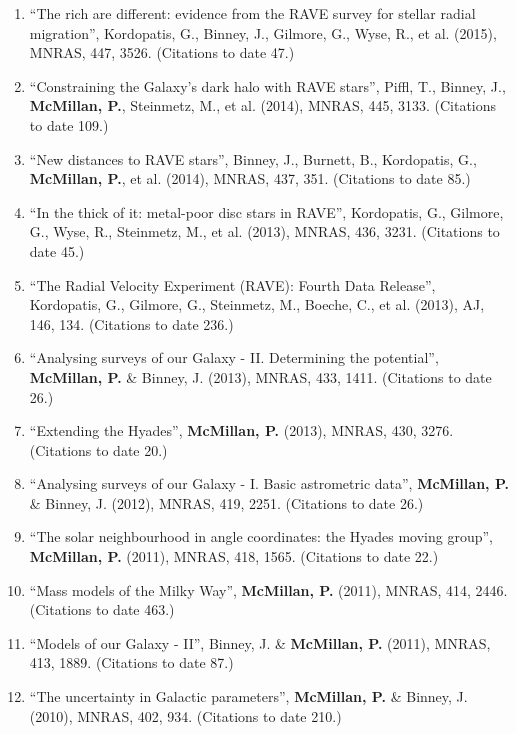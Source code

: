\documentclass{resume}
\begin{document}
\begin{enumerate}
\item ``The rich are different: evidence from the RAVE survey for stellar radial migration'', Kordopatis, G., Binney, J., Gilmore, G., Wyse, R., et al. (2015), MNRAS, 447, 3526. (Citations to date 47.)

\item ``Constraining the Galaxy's dark halo with RAVE stars'', Piffl, T., Binney, J., \textbf{McMillan, P.}, Steinmetz, M., et al. (2014), MNRAS, 445, 3133. (Citations to date 109.)

\item ``New distances to RAVE stars'', Binney, J., Burnett, B., Kordopatis, G., \textbf{McMillan, P.}, et al. (2014), MNRAS, 437, 351. (Citations to date 85.)

\item ``In the thick of it: metal-poor disc stars in RAVE'', Kordopatis, G., Gilmore, G., Wyse, R., Steinmetz, M., et al. (2013), MNRAS, 436, 3231. (Citations to date 45.)

\item ``The Radial Velocity Experiment (RAVE): Fourth Data Release'', Kordopatis, G., Gilmore, G., Steinmetz, M., Boeche, C., et al. (2013), AJ, 146, 134. (Citations to date 236.)

\item ``Analysing surveys of our Galaxy - II. Determining the potential'', \textbf{McMillan, P.} \& Binney, J. (2013), MNRAS, 433, 1411. (Citations to date 26.)

\item ``Extending the Hyades'', \textbf{McMillan, P.} (2013), MNRAS, 430, 3276. (Citations to date 20.)

\item ``Analysing surveys of our Galaxy - I. Basic astrometric data'', \textbf{McMillan, P.} \& Binney, J. (2012), MNRAS, 419, 2251. (Citations to date 26.)

\item ``The solar neighbourhood in angle coordinates: the Hyades moving group'', \textbf{McMillan, P.} (2011), MNRAS, 418, 1565. (Citations to date 22.)

\item ``Mass models of the Milky Way'', \textbf{McMillan, P.} (2011), MNRAS, 414, 2446. (Citations to date 463.)

\item ``Models of our Galaxy - II'', Binney, J. \& \textbf{McMillan, P.} (2011), MNRAS, 413, 1889. (Citations to date 87.)

\item ``The uncertainty in Galactic parameters'', \textbf{McMillan, P.} \& Binney, J. (2010), MNRAS, 402, 934. (Citations to date 210.)


\end{enumerate}
\end{document}
